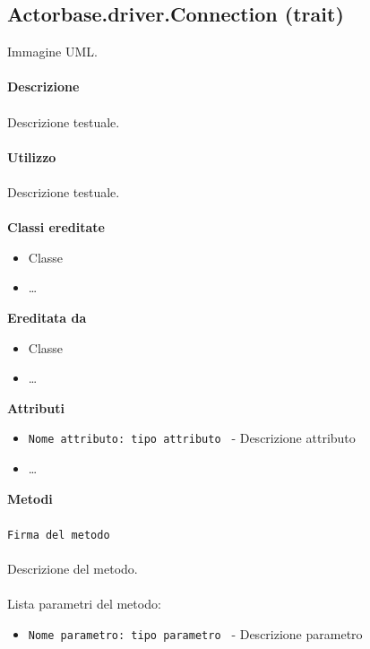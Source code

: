 \documentclass[a4paper]{article}
\begin{document}
	\subsection{Actorbase.driver.Connection (trait)}	
		Immagine UML.
		\\ \\
		\textbf{Descrizione}
			\\ \\
			Descrizione testuale.
			\\ \\
		\textbf{Utilizzo}
			\\ \\
			Descrizione testuale.
			\\ \\
		\textbf{Classi ereditate}
			\begin{itemize}
				\item Classe
				\item \dots
			\end{itemize}
		\textbf{Ereditata da}
			\begin{itemize}
				\item Classe
				\item \dots
			\end{itemize}
		\textbf{Attributi}
			\begin{itemize}
				\item \texttt{Nome attributo: tipo attributo } - Descrizione attributo
				\item \dots
			\end{itemize}
		\textbf{Metodi}
			\\ \\
			\texttt{Firma del metodo}
			\\ \\
			Descrizione del metodo.
			\\ \\
			Lista parametri del metodo:
			\begin{itemize}
				\item \texttt{Nome parametro: tipo parametro } - Descrizione parametro
			\end{itemize}
			
\end{document}
